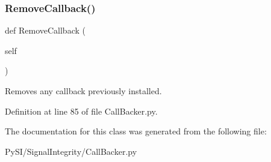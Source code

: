 \subsubsection{\texorpdfstring{Remove\+Callback()}{RemoveCallback()}}
{\footnotesize\ttfamily def Remove\+Callback (\begin{DoxyParamCaption}\item[{}]{self }\end{DoxyParamCaption})}



Removes any callback previously installed. 



Definition at line 85 of file Call\+Backer.\+py.



The documentation for this class was generated from the following file\+:\begin{DoxyCompactItemize}
\item 
Py\+S\+I/\+Signal\+Integrity/Call\+Backer.\+py\end{DoxyCompactItemize}
